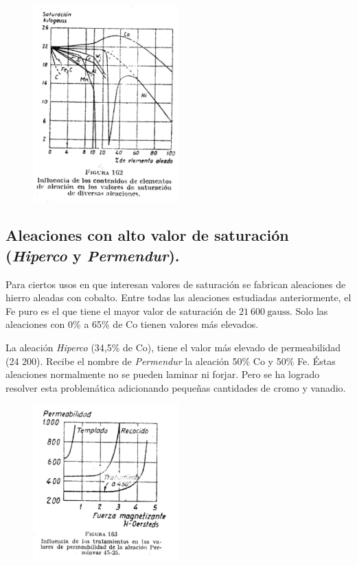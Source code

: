 \documentclass[12pt,a4paper]{article}
\begin{document}
\begin{figure}[t]    
    \centering         
    \includegraphics[width=0.5\textwidth]{IMAGENES LATEX/8.jpg}
\end{figure}

\subsection{Aleaciones con alto valor de saturación (\textit{Hiperco} y \textit{Permendur}).}

Para ciertos usos en que interesan valores de saturación se fabrican aleaciones de hierro aleadas con cobalto. Entre todas las aleaciones estudiadas anteriormente, el Fe puro es el que tiene el mayor valor de saturación de $21\ 600\ \mathrm{gauss}$. Solo las aleaciones con 0\% a 65\% de Co tienen valores más elevados.

La aleación \textit{Hiperco} (34,5\% de Co), tiene el valor más elevado de permeabilidad (24 200). Recibe el nombre de \textit{Permendur} la aleación 50\% Co y 50\% Fe. Éstas aleaciones normalmente no se pueden laminar ni forjar. Pero se ha logrado resolver esta problemática adicionando pequeñas cantidades de cromo y vanadio.

\begin{figure}[H]    
    \centering         
    \includegraphics[width=0.5\textwidth]{IMAGENES LATEX/9.jpg}
\end{figure}
\end{document}
